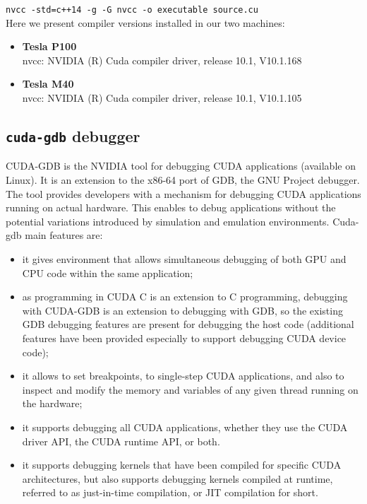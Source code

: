 		\texttt{nvcc -std=c++14 -g -G nvcc -o executable source.cu} \\	
		
		Here we present compiler versions installed in our two machines:\\
		
		\begin{itemize}
			\item \textbf{Tesla P100}\\
			nvcc: NVIDIA (R) Cuda compiler driver, 
			 release 10.1, V10.1.168			
				 
			\item \textbf{Tesla M40}\\
			 nvcc: NVIDIA (R) Cuda compiler driver, 
			 release 10.1, V10.1.105
		\end{itemize}

		 
	\subsection{\texttt{cuda-gdb} debugger}
		CUDA-GDB is the NVIDIA tool for debugging CUDA applications (available on Linux). It is an extension to the x86-64 port of GDB, the GNU Project debugger.\\
		The tool provides developers with a mechanism for debugging CUDA applications running on actual hardware. This enables to debug applications without the potential variations introduced by simulation and emulation environments.
		Cuda-gdb main features are:
		\begin{itemize}
			\item it gives environment that allows simultaneous debugging of both GPU and CPU code within the same application;
			\item as programming in CUDA C is an extension to C programming, debugging with CUDA-GDB is an extension to debugging with GDB, so the existing GDB debugging features are present for debugging the host code (additional features have been provided especially to support debugging CUDA device code);	
			
			\item it allows to set breakpoints, to single-step CUDA applications, and also to inspect and modify the memory and variables of any given thread running on the hardware;
			
			\item it supports debugging all CUDA applications, whether they use the CUDA driver API, the CUDA runtime API, or both.
			
			\item it supports debugging kernels that have been compiled for specific CUDA architectures, but also supports debugging kernels compiled at runtime, referred to as just-in-time compilation, or JIT compilation for short.
		\end{itemize}
		
